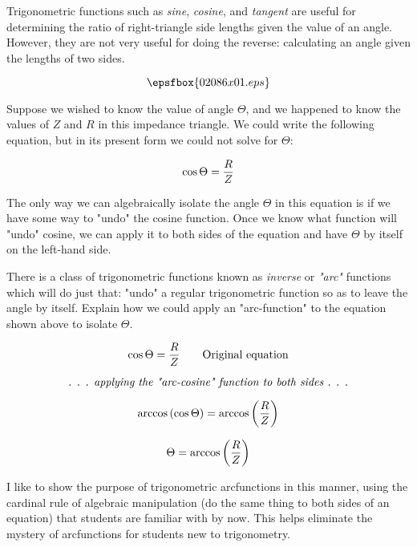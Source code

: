 

Trigonometric functions such as {\it sine}, {\it cosine}, and {\it tangent} are useful for determining the ratio of right-triangle side lengths given the value of an angle.  However, they are not very useful for doing the reverse: calculating an angle given the lengths of two sides.

$$\epsfbox{02086x01.eps}$$

Suppose we wished to know the value of angle $\Theta$, and we happened to know the values of $Z$ and $R$ in this impedance triangle.  We could write the following equation, but in its present form we could not solve for $\Theta$:

$$\cos \Theta = {R \over Z}$$

The only way we can algebraically isolate the angle $\Theta$ in this equation is if we have some way to "undo" the cosine function.  Once we know what function will "undo" cosine, we can apply it to both sides of the equation and have $\Theta$ by itself on the left-hand side.

There is a class of trigonometric functions known as {\it inverse} or {\it "arc"} functions which will do just that: "undo" a regular trigonometric function so as to leave the angle by itself.  Explain how we could apply an "arc-function" to the equation shown above to isolate $\Theta$.







$$\cos \Theta = {R \over Z} \hbox{\hskip 20pt Original equation}$$

$$\hbox{\it . . . applying the "arc-cosine" function to both sides . . .}$$

$$\arccos \left( \cos \Theta \right) = \arccos \left( {R \over Z} \right)$$

$$\Theta = \arccos \left( {R \over Z} \right)$$








I like to show the purpose of trigonometric arcfunctions in this manner, using the cardinal rule of algebraic manipulation (do the same thing to both sides of an equation) that students are familiar with by now.  This helps eliminate the mystery of arcfunctions for students new to trigonometry.




